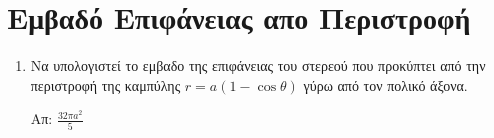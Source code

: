 \section*{Εμβαδό Επιφάνειας απο Περιστροφή}

\begin{enumerate}
  \item Να υπολογιστεί το εμβαδο της επιφάνειας του στερεού που προκύπτει από την
    περιστροφή της καμπύλης $ r = a(1 - \cos{\theta}) $ γύρω από τον πολικό
    άξονα. 

    \hfill Απ: $ \frac{32 \pi  a^{2}}{5} $
\end{enumerate}


